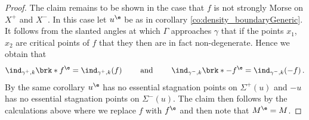 \begin{proof}
  
  

  The claim remains to be shown in the case that $f$ is not strongly Morse on $X^+$ and $X^-$. In this case let
  $u^\e$ be as in corollary \ref{co:density_boundaryGeneric}.
  It follows from the slanted angles at which $\Gamma$ approaches $\gamma$ that if the points $x_1$, $x_2$ are critical points of $f$
  that they then are in fact non-degenerate.
  Hence we obtain that
  \begin{align}
    \ind_{\gamma^+,k}\brk*{f^\e}=\ind_{\gamma^+,k}(f)\qquad\text{ and }\qquad 
    \ind_{\gamma^-,k}\brk*{-f^\e}=\ind_{\gamma^-,k}(-f)\,.
    \label{eq:n3_disproof_morse_indexApprox}
  \end{align}
  By the same corollary $u^\e$ has no essential stagnation points on $\Sigma^+(u)$
  and $-u$ has no essential stagnation points on $\Sigma^-(u)$.
  The claim then follows by the calculations above where we replace
  $f$ with $f^\e$ and then note that $M^\e=M$.
\end{proof}
